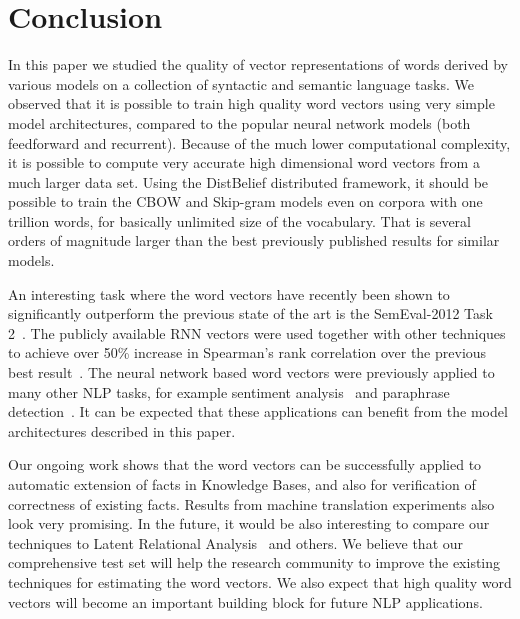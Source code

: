 \documentclass{article} %
\begin{document}

\section{Conclusion}


In this paper we studied the quality of vector representations of words derived by various models on a collection of syntactic and semantic language tasks.
We observed that it is possible to train high quality
word vectors using very simple model architectures, compared to the popular neural network models (both feedforward and recurrent). Because of the much lower computational complexity,
it is possible to compute very accurate high dimensional word vectors from a much larger data set. Using the DistBelief distributed framework, it should be possible to train
the CBOW and Skip-gram models even on corpora with one trillion words, for basically unlimited size of the vocabulary. That is several orders of magnitude larger than the best previously published results for similar models.

An interesting task where the word vectors have recently been shown to significantly outperform the previous state of the art is the SemEval-2012 Task 2~\cite{Jurgens}. The publicly available
RNN vectors were used together with other techniques to achieve over 50\% increase in Spearman's rank correlation over the previous best result~\cite{NAACL2}.
The neural network based word vectors were previously applied to many other NLP tasks, for example sentiment analysis~\cite{sentiment} and paraphrase detection~\cite{paraphrase}. It can be expected
that these applications can benefit from the model architectures described in this paper.

Our ongoing work shows that the word vectors can be successfully applied to automatic extension of facts in Knowledge Bases, and also for verification of correctness of existing facts. Results from machine
translation experiments also look very promising.
In the future, it would be also interesting to compare our techniques to
Latent Relational Analysis~\cite{Turney} and others.
We believe that our comprehensive test set will help the research community to improve the existing techniques for estimating the word vectors.
We also expect that high quality word vectors will become an important building block for future NLP applications.
\end{document}
